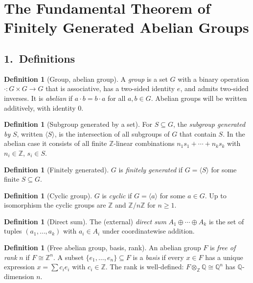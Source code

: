 \documentclass{article}
\theoremstyle{definition}
\newtheorem{definition}[theorem]{Definition}
\begin{document}
\section*{The Fundamental Theorem of Finitely Generated Abelian Groups}

\subsection*{1.\ Definitions}

\begin{definition}[Group, abelian group]
A \emph{group} is a set $G$ with a binary operation
$\cdot:G\times G\to G$ that is associative, has a two-sided identity
$e$, and admits two-sided inverses. It is \emph{abelian} if
$a\cdot b=b\cdot a$ for all $a,b\in G$. Abelian groups will be written
additively, with identity $0$.
\end{definition}

\begin{definition}[Subgroup generated by a set]
For $S\subseteq G$, the \emph{subgroup generated by} $S$, written
$\langle S\rangle$, is the intersection of all subgroups of $G$ that
contain $S$. In the abelian case it consists of all finite
$\mathbb{Z}$-linear combinations $n_1s_1+\cdots+n_ks_k$ with
$n_i\in\mathbb{Z}$, $s_i\in S$.
\end{definition}

\begin{definition}[Finitely generated]
$G$ is \emph{finitely generated} if $G=\langle S\rangle$ for some
finite $S\subseteq G$.
\end{definition}

\begin{definition}[Cyclic group]
$G$ is \emph{cyclic} if $G=\langle a\rangle$ for some $a\in G$. Up to
isomorphism the cyclic groups are $\mathbb{Z}$ and $\mathbb{Z}/n\mathbb{Z}$ for $n\ge 1$.
\end{definition}

\begin{definition}[Direct sum]
The (external) \emph{direct sum} $A_1\oplus\cdots\oplus A_k$ is the
set of tuples $(a_1,\dots,a_k)$ with $a_i\in A_i$ under coordinatewise
addition.
\end{definition}

\begin{definition}[Free abelian group, basis, rank]
An abelian group $F$ is \emph{free of rank} $n$ if $F\cong\mathbb{Z}^n$.
A subset $\{e_1,\dots,e_n\}\subseteq F$ is a \emph{basis} if every
$x\in F$ has a unique expression $x=\sum c_ie_i$ with $c_i\in\mathbb{Z}$.
The rank is well-defined: $F\otimes_{\mathbb{Z}}\mathbb{Q}\cong\mathbb{Q}^n$ has
$\mathbb{Q}$-dimension $n$.
\end{definition}
\end{document}
